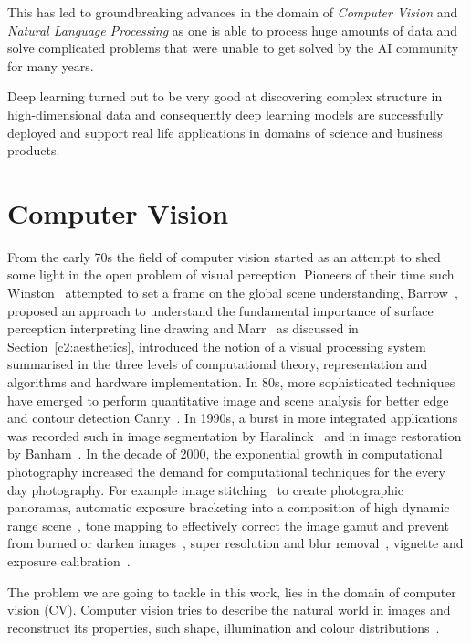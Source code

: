 This has led to groundbreaking advances in the domain of \textit{Computer Vision} and \textit{Natural Language Processing} as one is able to process huge amounts of data and solve complicated problems that were unable to get solved by the AI community for many years.

Deep learning turned out to be very good at discovering complex structure in high-dimensional data and consequently deep learning models are successfully deployed and support real life applications in domains of science and business products.

\section{Computer Vision}

From the early 70s the field of computer vision started as an attempt to shed some light in the open problem of visual perception. Pioneers of their time such Winston~\cite{winston1975psychology} attempted to set a frame on the global scene understanding, Barrow~\cite{barrow1981interpreting}, proposed an approach to understand the fundamental importance of surface perception interpreting line drawing and Marr~\cite{marr1982vision} as discussed in Section~\ref{c2:aesthetics}, introduced the notion of a visual processing system summarised in the three levels of computational theory, representation and algorithms and hardware implementation.
In 80s, more sophisticated techniques have emerged to perform quantitative image and scene analysis for better edge and contour detection Canny~\cite{canny1986computational}.
In 1990s, a burst in more integrated applications was recorded such in image segmentation by Haralinck~\cite{haralick1985image} and in image restoration by Banham~\cite{banham1997digital}.
In the decade of 2000, the exponential growth in computational photography increased the demand for computational techniques for the every day photography. For example image stitching~\cite{brown2007automatic} to create photographic panoramas, automatic exposure bracketing into a composition of high dynamic range scene~\cite{reinhard2010high}, tone mapping to effectively correct the image gamut and prevent from burned or darken images~\cite{durand2002fast}, super resolution and blur removal~\cite{baker2002limits}, vignette and exposure calibration~\cite{goldman2010vignette}.

The problem we are going to tackle in this work, lies in the domain of computer vision (CV). Computer vision tries to describe the natural world in images and reconstruct its properties, such shape, illumination and colour distributions~\cite{szeliski2010computer}.

